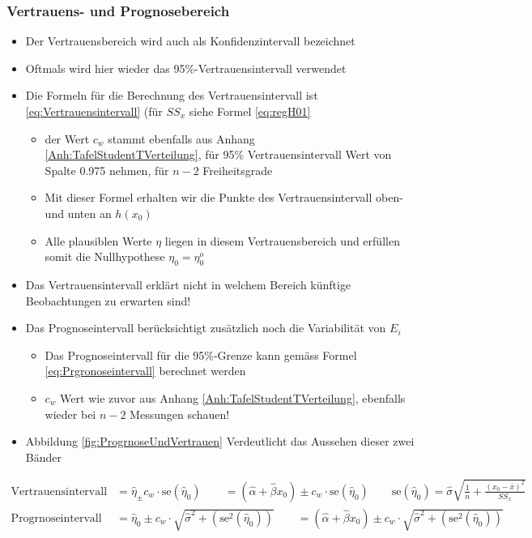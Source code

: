 \subsubsection{Vertrauens- und Prognosebereich}
\label{subsubsec:VertrauensUndPrognoseBereich}
\begin{itemize}
	\item Der Vertrauensbereich wird auch als Konfidenzintervall bezeichnet
	\item Oftmals wird hier wieder das 95\%-Vertrauensintervall verwendet 
	\item Die Formeln für die Berechnung des Vertrauensintervall ist \ref{eq:Vertrauensintervall} (für $SS_x$ siehe Formel \ref{eq:regH01}
	\begin{itemize}
		\item der Wert $c_w$ stammt ebenfalls aus Anhang \ref{Anh:TafelStudentTVerteilung}, für 95\% Vertrauensintervall Wert von Spalte 0.975 nehmen, für $n-2$ Freiheitsgrade
		\item Mit dieser Formel erhalten wir die Punkte des Vertrauensintervall oben- und unten an $h(x_0)$ 
		\item Alle plausiblen Werte $\eta$ liegen in diesem Vertrauensbereich und erfüllen somit die Nullhypothese $\eta_0 = \eta_0^o$
	\end{itemize}
	\item Das Vertrauensintervall erklärt nicht in welchem Bereich künftige Beobachtungen zu erwarten sind!
	\item Das Prognoseintervall berücksichtigt zusätzlich noch die Variabilität von $E_i$
	\begin{itemize}
		\item Das Prognoseintervall für die 95\%-Grenze kann gemäss Formel \ref{eq:Prgronoseintervall} berechnet werden
		\item $c_w$ Wert wie zuvor aus Anhang \ref{Anh:TafelStudentTVerteilung}, ebenfalls wieder bei $n-2$ Messungen schauen!
	\end{itemize}
	\item Abbildung \ref{fig:ProgrnoseUndVertrauen} Verdeutlicht das Aussehen dieser zwei Bänder
\end{itemize}
\begin{align}
	\label{eq:Vertrauensintervall}
	\text{Vertrauensintervall} &= \hat{\eta}_\pm c_w \cdot \text{se}\left(\hat{\eta}_0\right) \qquad= \left(\hat{\alpha}+\hat{\beta}x_0\right)\pm c_w \cdot \text{se}\left(\hat{\eta}_0\right) \qquad
	\text{se}\left(\hat{\eta}_0\right) = \hat{\sigma}\sqrt{\frac{1}{n}+\frac{(x_0-\bar{x})^2}{SS_x}}\\
	\label{eq:Prgronoseintervall} 
	\text{Progrnoseintervall} &= \hat{\eta}_0\pm c_w \cdot \sqrt{\hat{\sigma}^2+\left(\text{se}^2\left(\hat{\eta}_0\right)\right)} \qquad= \left(\hat{\alpha}+\hat{\beta}x_0\right)\pm c_w \cdot \sqrt{\hat{\sigma}^2+\left(\text{se}^2\left(\hat{\eta}_0\right)\right)}
\end{align}
